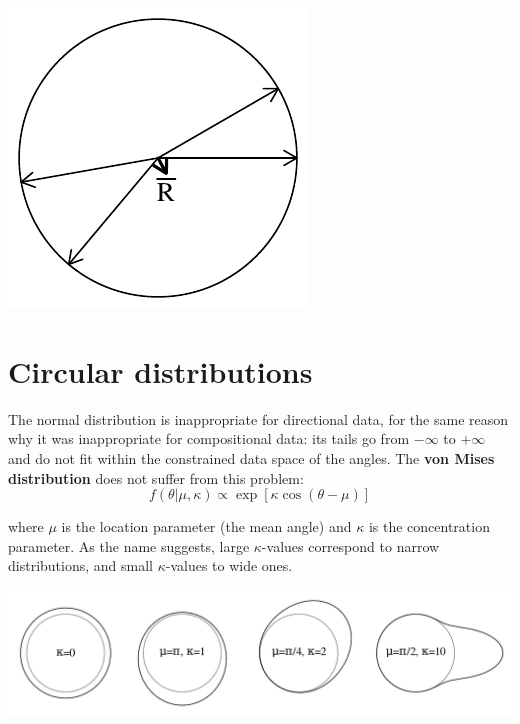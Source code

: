 \noindent\begin{minipage}[t][][b]{.2\textwidth}
\includegraphics[]{../figures/lowconcentration.pdf}\medskip
\end{minipage}
\begin{minipage}[t][][t]{.8\textwidth}
  \label{fig:lowconcentration}
\end{minipage}

\section{Circular distributions}
\label{sec:circular-distributions}

The normal distribution is inappropriate for directional data, for the
same reason why it was inappropriate for compositional data: its tails
go from $-\infty$ to $+\infty$ and do not fit within the constrained
data space of the angles. The \textbf{von Mises distribution} does not
suffer from this problem:
\begin{equation}
  f(\theta|\mu,\kappa) \propto \exp[\kappa \cos(\theta-\mu)]
  \label{eq:vonMises}
\end{equation}

\noindent where $\mu$ is the location parameter (the mean angle) and
$\kappa$ is the concentration parameter. As the name suggests, large
$\kappa$-values correspond to narrow distributions, and small
$\kappa$-values to wide ones.

\noindent\includegraphics[]{../figures/vonMises.pdf}
\begingroup {}
\label{fig:vonMises}\endgroup

